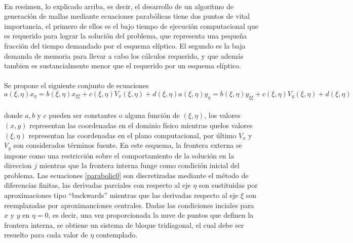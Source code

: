 \documentclass[letterpaper, openright, 12pt]{book}
\begin{document}
		\paragraph*{}
			En resúmen, lo explicado arriba, es decir, el desarrollo de un algoritmo de generación de mallas mediante ecuaciones parabólicas tiene dos puntos de vital importancia, el primero de ellos es el bajo tiempo de ejecución computacional que es requerido para lograr la solución del problema, que representa una pequeña fracción del tiempo demandado por el esquema elíptico. El segundo es la baja demanda de memoria para llevar a cabo los cálculos requerido, y que además tambien es sustancialmente menor que el requerido por un esquema elíptico.
		
		\paragraph*{}
			Se propone el siguiente conjunto de ecuaciones
			\begin{subequations}
				\begin{equation}
					a(\xi, \eta) x_\eta = b(\xi, \eta)x_{\xi\xi} + c(\xi, \eta)V_x(\xi, \eta) + d(\xi, \eta)
				\end{equation}
				\begin{equation}
					a(\xi, \eta) y_\eta = b(\xi, \eta)y_{\xi\xi} + c(\xi, \eta)V_y(\xi, \eta) + d(\xi, \eta)
				\end{equation}
				\label{parabolic0}
			\end{subequations}\\
			donde $a, b$ y $c$ pueden ser constantes o alguna función de $(\xi,\eta)$, los valores $(x, y)$ representan las coordenadas en el dominio físico mientras quelos valores $(\xi, \eta)$ representan las coordenadas en el plano computacional, por último $V_x$ y $V_y$ son considerados términos fuente. En este esquema, la frontera externa se impone como una restricción sobre el comportamiento de la solución en la direccion $j$ mientras que la frontera interna funge como condición inicial del problema. Las ecuaciones \ref{parabolic0} son discretizadas mediante el método de diferencias finitas, las derivadas parciales con respecto al eje $\eta$ son sustituidas por aproximaciones tipo ``backwards'' mientras que las derivadas respecto al eje $\xi$ son reemplazadas por aproximanciones centrales. Dadas las condiciones inciales para $x$  y $y$ en $\eta = 0$, es decir, una vez proporcionada la nuve de puntos que definen la frontera interna, se obtiene un sistema de bloque tridiagonal, el cual debe ser resuelto para cada valor de $\eta$ contemplado.
		
\end{document}
